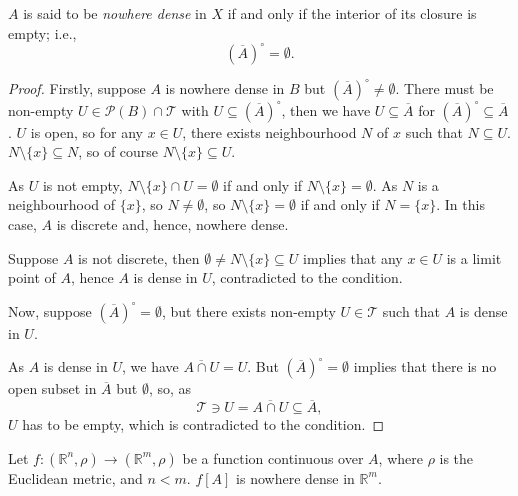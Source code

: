 \begin{proposition}
	$A$ is said to be \textit{nowhere dense} in $X$ if and only if the interior of its closure is empty; i.e.,
	$$
	(\overline A)^\circ = \emptyset.
	$$
	
	\begin{proof}
		Firstly, suppose $A$ is nowhere dense in $B$ but $(\overline A)^\circ \ne \emptyset$. There must be non-empty $U \in \mathcal P(B) \cap \mathcal T$ with $U \subseteq (\overline A)^\circ$, then we have $U \subseteq \overline A$ for $(\overline A)^\circ \subseteq \overline A$. $U$ is open, so for any $x \in U$, there exists neighbourhood $N$ of $x$ such that $N \subseteq U$. $N \setminus \{x\} \subseteq N$, so of course $N \setminus \{x\} \subseteq U$.
		
		As $U$ is not empty, $N \setminus \{x\} \cap U = \emptyset$ if and only if $N \setminus \{x\} = \emptyset$. As $N$ is a neighbourhood of $\{x\}$, so $N \ne \emptyset$, so $N \setminus \{x\} = \emptyset$ if and only if $N = \{x\}$. In this case, $A$ is discrete and, hence, nowhere dense.
		
		Suppose $A$ is not discrete, then $\emptyset \ne N \setminus \{x\} \subseteq U$ implies that any $x \in U$ is a limit point of $A$, hence $A$ is dense in $U$, contradicted to the condition.
		
		Now, suppose $(\overline A)^\circ = \emptyset$, but there exists non-empty $U \in \mathcal T$ such that $A$ is dense in $U$.
		
		As $A$ is dense in $U$, we have $\overline{A \cap U} = U$. But $(\overline A)^\circ = \emptyset$ implies that there is no open subset in $\overline A$ but $\emptyset$, so, as
		$$
		\mathcal T \ni U = \overline{A \cap U} \subseteq \overline A,
		$$
		$U$ has to be empty, which is contradicted to the condition.
	\end{proof}
\end{proposition}


\begin{example}
	Let $f:(\mathbb R^n, \rho) \to (\mathbb R^{m}, \rho)$ be a function continuous over $A$, where $\rho$ is the Euclidean metric, and $n < m$. $f[A]$ is nowhere dense in $\mathbb R^{m}$.
\end{example}


